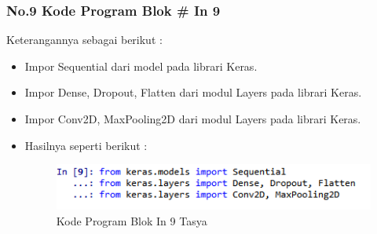\subsubsection{No.9 Kode Program Blok \# In 9}

Keterangannya sebagai berikut :\\
\begin{itemize}
\item Impor Sequential dari model pada librari Keras.
\item Impor Dense, Dropout, Flatten dari modul Layers pada librari Keras.
\item Impor Conv2D, MaxPooling2D dari modul Layers pada librari Keras.
\item Hasilnya seperti berikut : \\
\begin{figure}[ht]
\centering
\includegraphics[scale=0.5]{figures/Chapter 7/1164086/Praktek/chapter7tasya22.png}
\caption{Kode Program Blok In 9 Tasya}
\label{Praktek}
\end{figure}
\end{itemize}

